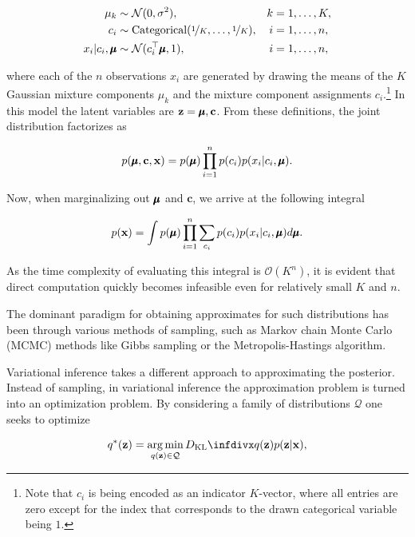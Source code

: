 \begin{align*}
\mu_k                       &\sim \mathcal{N}(0, \sigma^2),                                     & k &= 1, \dotsc, K,\\
c_i                         &\sim \text{Categorical}(\nicefrac{1}{K}, \dotsc, \nicefrac{1}{K}), & i &= 1, \dotsc, n,\\
x_i \vert c_i, \pmb{\mu} &\sim \mathcal{N}(c^{\top}_i \pmb{\mu}, 1),                      & i &= 1, \dotsc, n,
\end{align*}

where each of the $n$ observations $x_i$ are generated by drawing the means of the $K$ Gaussian mixture components $\mu_k$ and the mixture component assignments $c_i$.\footnote{Note that $c_i$ is being encoded as an indicator $K$-vector, where all entries are zero except for the index that corresponds to the drawn categorical variable being $1$.} In this model the latent variables are $\mathbf{z} = {\pmb{\mu}, \mathbf{c}}$. From these definitions, the joint distribution factorizes as

$$p(\pmb{\mu}, \mathbf{c}, \mathbf{x}) = p(\pmb{\mu}) \prod_{i=1}^{n} p(c_i) p(x_i \vert c_i, \pmb{\mu}).$$

Now, when marginalizing out $\pmb{\mu}$ and $\mathbf{c}$, we arrive at the following integral

$$p(\mathbf{x}) = \int p(\pmb{\mu}) \prod_{i=1}^{n} \sum_{c_i} p(c_i) p(x_i \vert c_i, \pmb{\mu}) d\pmb{\mu}.$$

As the time complexity of evaluating this integral is $\mathcal{O}(K^n)$, it is evident that direct computation quickly becomes infeasible even for relatively small $K$ and $n$.

The dominant paradigm for obtaining approximates for such distributions has been through various methods of sampling, such as Markov chain Monte Carlo (MCMC) methods like Gibbs sampling or the Metropolis-Hastings algorithm. 

Variational inference takes a different approach to approximating the posterior. Instead of sampling, in variational inference the approximation problem is turned into an optimization problem. By considering a family of distributions $\mathcal{Q}$ one seeks to optimize

\begin{equation}
q^{*}(\bz) = \argmin_{q(\bz) \in \mathcal{Q}} \dkl{q(\bz)}{p(\bz \vert \bx)},
\label{eq:vi}
\end{equation}

